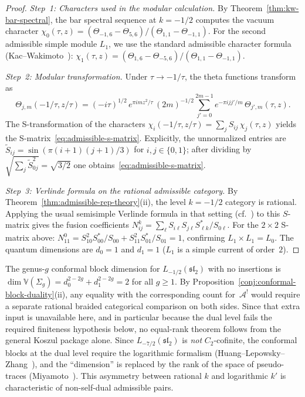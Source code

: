 \begin{proof}
\emph{Step~1: Characters used in the modular calculation.}
By Theorem~\ref{thm:kw-bar-spectral}, the bar spectral
sequence at $k = -1/2$ computes the vacuum character
$\chi_0(\tau, z) = (\Theta_{-1,6} - \Theta_{5,6})/
(\Theta_{1,1} - \Theta_{-1,1})$. For the second admissible
simple module $L_1$, we use the standard admissible character
formula \textup{(}Kac--Wakimoto~\cite{KW88}\textup{)}:
$\chi_1(\tau, z) = (\Theta_{1,6} - \Theta_{-5,6})/
(\Theta_{1,1} - \Theta_{-1,1})$.

\emph{Step~2: Modular transformation.}
Under $\tau \to -1/\tau$, the theta functions transform as
\[
\Theta_{j,m}(-1/\tau, z/\tau)
= (-i\tau)^{1/2}\, e^{\pi i m z^2/\tau}\,
(2m)^{-1/2}\sum_{j'=0}^{2m-1}
e^{-\pi i j j'/m}\, \Theta_{j',m}(\tau, z).
\]
The S-transformation of the characters
$\chi_i(-1/\tau, z/\tau) = \sum_j S_{ij}\, \chi_j(\tau, z)$
yields the S-matrix~\eqref{eq:admissible-s-matrix}.
Explicitly, the unnormalized entries are
$\tilde{S}_{ij} = \sin(\pi(i+1)(j+1)/3)$ for
$i, j \in \{0, 1\}$; after dividing by
$\sqrt{\sum_j \tilde{S}_{0j}^2} = \sqrt{3/2}$
one obtains~\eqref{eq:admissible-s-matrix}.

\emph{Step~3: Verlinde formula on the rational admissible category.}
By Theorem~\ref{thm:admissible-rep-theory}(ii), the level
$k=-1/2$ category is rational. Applying the usual semisimple
Verlinde formula in that setting \textup{(}cf.~\cite{HLZ}\textup{)}
to this $S$-matrix gives the fusion coefficients
$N_{ij}^k = \sum_\ell S_{i\ell} S_{j\ell}
S_{\ell k}^*/S_{0\ell}$.
For the $2 \times 2$ S-matrix above:
$N_{11}^0 = S_{10}^2 S_{00}^*/S_{00}
+ S_{11}^2 S_{01}^*/S_{01} = 1$,
confirming $L_1 \times L_1 = L_0$.
The quantum dimensions are $d_0 = 1$ and $d_1 = 1$
($L_1$ is a simple current of order~$2$).
\end{proof}

\begin{remark}
\label{rem:admissible-verlinde-complementarity}
The genus-$g$ conformal block dimension for $L_{-1/2}(\mathfrak{sl}_2)$
with no insertions is $\dim \mathbb{V}(\Sigma_g) = d_0^{2-2g}
+ d_1^{2-2g} = 2$ for all $g \geq 1$. By
Proposition~\ref{conj:conformal-block-duality}(ii), any equality with
the corresponding count for~$\mathcal{A}^!$ would require a separate
rational braided categorical comparison on both sides. Since that
extra input is unavailable here, and in particular because the dual
level fails the required finiteness hypothesis below, no equal-rank
theorem follows from the general Koszul package alone.
Since $L_{-7/2}(\mathfrak{sl}_2)$ is \emph{not}
$C_2$-cofinite, the conformal blocks at the dual level
require the logarithmic formalism
(Huang--Lepowsky--Zhang~\cite{HLZ}), and the
``dimension'' is replaced by the rank of the space of
pseudo-traces (Miyamoto~\cite{Miyamoto04}).
This asymmetry between rational $k$ and logarithmic
$k'$ is characteristic of non-self-dual admissible pairs.
\end{remark}

